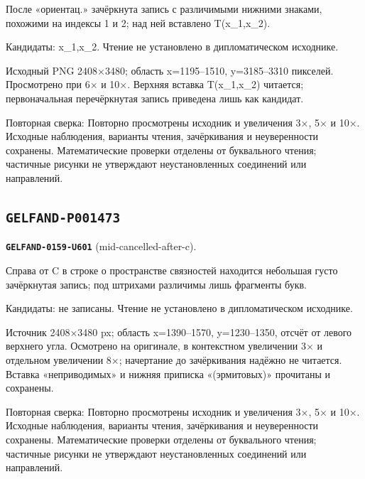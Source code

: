 После «ориентац.» зачёркнута запись с различимыми нижними знаками, похожими на индексы 1 и 2; над ней вставлено T(x\_1,x\_2).\par
Кандидаты: x\_1,x\_2. Чтение не установлено в дипломатическом исходнике.\par
Исходный PNG 2408×3480; область x=1195–1510, y=3185–3310 пикселей. Просмотрено при 6× и 10×. Верхняя вставка T(x\_1,x\_2) читается; первоначальная перечёркнутая запись приведена лишь как кандидат.\par
Повторная сверка: Повторно просмотрены исходник и увеличения 3×, 5× и 10×. Исходные наблюдения, варианты чтения, зачёркивания и неуверенности сохранены. Математические проверки отделены от буквального чтения; частичные рисунки не утверждают неустановленных соединений или направлений.\par\medskip
\subsection*{\texttt{GELFAND-P001473}}
\par\noindent\leavevmode{}\label{GELFAND-0159-U601}\label{GELFAND-P001473:mid-cancelled-after-c}\textbf{\texttt{GELFAND-0159-U601}} (mid-cancelled-after-c).\nopagebreak[4]\par
Справа от C в строке о пространстве связностей находится небольшая густо зачёркнутая запись; под штрихами различимы лишь фрагменты букв.\par
Кандидаты: не записаны. Чтение не установлено в дипломатическом исходнике.\par
Источник 2408×3480 px; область x=1390–1570, y=1230–1350, отсчёт от левого верхнего угла. Осмотрено на оригинале, в контекстном увеличении 3× и отдельном увеличении 8×; начертание до зачёркивания надёжно не читается. Вставка «неприводимых» и нижняя приписка «(эрмитовых)» прочитаны и сохранены.\par
Повторная сверка: Повторно просмотрены исходник и увеличения 3×, 5× и 10×. Исходные наблюдения, варианты чтения, зачёркивания и неуверенности сохранены. Математические проверки отделены от буквального чтения; частичные рисунки не утверждают неустановленных соединений или направлений.\par\medskip
